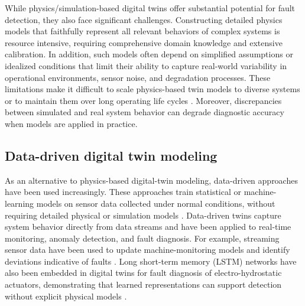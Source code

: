 \documentclass[a4paper,10pt]{cas-sc}%
\begin{document}
While physics/simulation-based digital twins offer substantial potential for fault detection, they also face significant challenges. Constructing detailed physics models that faithfully represent all relevant behaviors of complex systems is resource intensive, requiring comprehensive domain knowledge and extensive calibration. In addition, such models often depend on simplified assumptions or idealized conditions that limit their ability to capture real-world variability in operational environments, sensor noise, and degradation processes. These limitations make it difficult to scale physics-based twin models to diverse systems or to maintain them over long operating life cycles \citep{van2022predictive, ZHONG2023e14534}. Moreover, discrepancies between simulated and real system behavior can degrade diagnostic accuracy when models are applied in practice.


\subsection{Data-driven digital twin modeling}\label{sect:2.3}


As an alternative to physics-based digital-twin modeling, data-driven approaches have been used increasingly. These approaches train statistical or machine-learning models on sensor data collected under normal conditions, without requiring detailed physical or simulation models \citep{kreuzer2024artificial,nele2024towards, khan2025data}. Data-driven twins capture system behavior directly from data streams and have been applied to real-time monitoring, anomaly detection, and fault diagnosis. For example, streaming sensor data have been used to update machine-monitoring models and identify deviations indicative of faults \citep{cheruku2025data}. Long short-term memory (LSTM) networks have also been embedded in digital twins for fault diagnosis of electro-hydrostatic actuators, demonstrating that learned representations can support detection without explicit physical models \citep{rodriguez2024development}.
\end{document}
